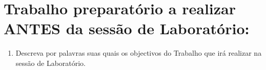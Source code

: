 \documentclass[a4paper,12pt]{article}  %
\begin{document}
\section{\sf Trabalho preparatório a realizar  ANTES da sessão de Laboratório:}
\begin{enumerate}
\item Descreva por palavras suas quais os objectivos do Trabalho que irá realizar na sessão de Laboratório.


\end{enumerate}
\noindent\underline{\makebox[\textwidth][r]{~}} \\
\noindent\underline{\makebox[\textwidth][r]{~}} \\
\noindent\underline{\makebox[\textwidth][r]{~}} \\
\noindent\underline{\makebox[\textwidth][r]{~}} \\
\noindent\underline{\makebox[\textwidth][r]{~}} \\
\noindent\underline{\makebox[\textwidth][r]{~}} \\
\noindent\underline{\makebox[\textwidth][r]{~}} \\
\end{document}
